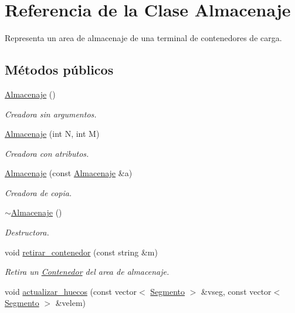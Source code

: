 \hypertarget{class_almacenaje}{}\section{Referencia de la Clase Almacenaje}
\label{class_almacenaje}


Representa un area de almacenaje de una terminal de contenedores de carga.  


\subsection*{Métodos públicos}
\begin{DoxyCompactItemize}
\item 
\hyperlink{class_almacenaje_aac76140a19e358858ec775cae4d23037}{Almacenaje} ()
\begin{DoxyCompactList}\small\item\em Creadora sin argumentos. \end{DoxyCompactList}\item 
\hyperlink{class_almacenaje_a647530e3470da788413fe0288eeca339}{Almacenaje} (int N, int M)
\begin{DoxyCompactList}\small\item\em Creadora con atributos. \end{DoxyCompactList}\item 
\hyperlink{class_almacenaje_af76b03e29489309e937d5a3b73bd77a4}{Almacenaje} (const \hyperlink{class_almacenaje}{Almacenaje} \&a)
\begin{DoxyCompactList}\small\item\em Creadora de copia. \end{DoxyCompactList}\item 
\hyperlink{class_almacenaje_a81867a2596bd5b0d654803fc34d8bc9a}{$\sim$\+Almacenaje} ()
\begin{DoxyCompactList}\small\item\em Destructora. \end{DoxyCompactList}\item 
void \hyperlink{class_almacenaje_aa4a16321fcfba32873521b9af6c8b73a}{retirar\+\_\+contenedor} (const string \&m)
\begin{DoxyCompactList}\small\item\em Retira un \hyperlink{class_contenedor}{Contenedor} del area de almacenaje. \end{DoxyCompactList}\item 
void \hyperlink{class_almacenaje_af91b0be022140b41af913728dd045e35}{actualizar\+\_\+huecos} (const vector$<$ \hyperlink{class_segmento}{Segmento} $>$ \&vseg, const vector$<$ \hyperlink{class_segmento}{Segmento} $>$ \&velem)

\end{DoxyCompactItemize}
